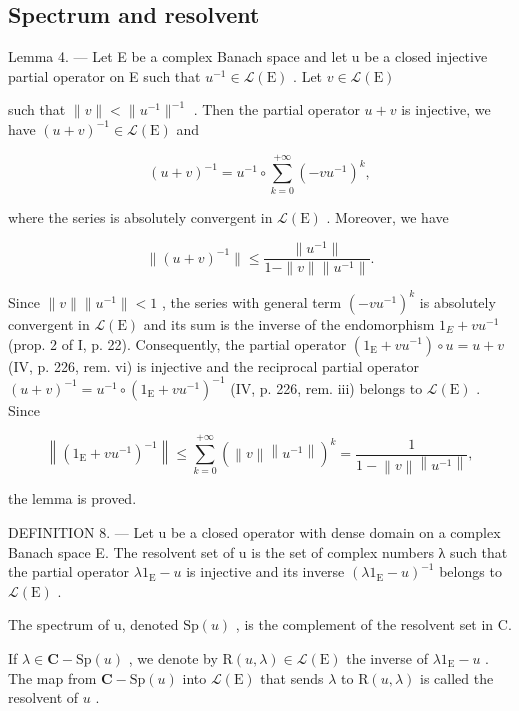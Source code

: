 \subsection{Spectrum and resolvent}

Lemma 4. --- Let E be a complex Banach space and let u be a closed injective partial operator on E such that \(u^{-1} \in \mathcal{L}(\mathrm{E})\) . Let \(v \in \mathcal{L}(\mathrm{E})\)

such that \(\|v\| < \|u^{-1}\|^{-1}\) . Then the partial operator \(u + v\) is injective, we have \((u + v)^{-1} \in \mathcal{L}(\mathrm{E})\) and

\[
(u + v) ^ {- 1} = u ^ {- 1} \circ \sum_ {k = 0} ^ {+ \infty} (- v u ^ {- 1}) ^ {k},\tag{6}
\]

where the series is absolutely convergent in \(\mathcal{L}(\mathrm{E})\) . Moreover, we have

\[
\| (u + v) ^ {- 1} \| \leqslant \frac {\| u ^ {- 1} \|}{1 - \| v \| \| u ^ {- 1} \|}.
\]

Since \(\|v\|\|u^{-1}\|<1\) , the series with general term \((-vu^{-1})^{k}\) is absolutely convergent in \(\mathcal{L}(\mathrm{E})\) and its sum is the inverse of the endomorphism \(1_{E}+vu^{-1}\) (prop. 2 of I, p. 22). Consequently, the partial operator \((1_{\mathrm{E}}+vu^{-1})\circ u=u+v\) (IV, p. 226, rem. vi) is injective and the reciprocal partial operator \((u+v)^{-1}=u^{-1}\circ(1_{\mathrm{E}}+vu^{-1})^{-1}\) (IV, p. 226, rem. iii) belongs to \(\mathcal{L}(\mathrm{E})\) . Since

\[
\left\| \left(1 _ {\mathrm{E}} + v u ^ {- 1}\right) ^ {- 1} \right\| \leqslant \sum_ {k = 0} ^ {+ \infty} (\left\| v \right\| \left\| u ^ {- 1} \right\|) ^ {k} = \frac {1}{1 - \left\| v \right\| \left\| u ^ {- 1} \right\|},
\]

the lemma is proved.

DEFINITION 8. --- Let u be a closed operator with dense domain on a complex Banach space E. The resolvent set of u is the set of complex numbers λ such that the partial operator \(\lambda 1_{\mathrm{E}} - u\) is injective and its inverse \((\lambda 1_{\mathrm{E}} - u)^{-1}\) belongs to \(\mathcal{L}(\mathrm{E})\) .

The spectrum of u, denoted \(\mathrm{Sp}(u)\) , is the complement of the resolvent set in C.

If \(\lambda \in \mathbf{C} - \mathrm{Sp}(u)\) , we denote by \(\mathrm{R}(u,\lambda) \in \mathcal{L}(\mathrm{E})\) the inverse of \(\lambda 1_{\mathrm{E}} - u\) . The map from \(\mathbf{C} - \mathrm{Sp}(u)\) into \(\mathcal{L}(\mathrm{E})\) that sends \(\lambda\) to \(\mathrm{R}(u,\lambda)\) is called the resolvent of \(u\) .


